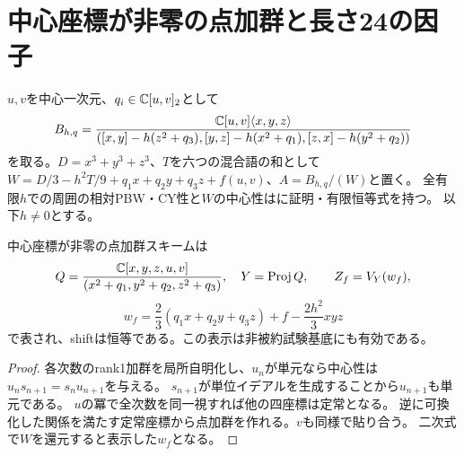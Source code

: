 \section{中心座標が非零の点加群と長さ24の因子}
$u,v$を中心一次元、$q_i\in\mathbb C[u,v]_2$として
\[
 B_{h,q}=\frac{\mathbb C[u,v]\langle x,y,z\rangle}
 {([x,y]-h(z^2+q_3),[y,z]-h(x^2+q_1),[z,x]-h(y^2+q_2))}
\]
を取る。$D=x^3+y^3+z^3$、$T$を六つの混合語の和として
$W=D/3-h^2T/9+q_1x+q_2y+q_3z+f(u,v)$、$A=B_{h,q}/(W)$と置く。
全有限$h$での周囲の相対PBW・CY性と$W$の中心性は\cite{Pair}に証明・有限恒等式を持つ。
以下$h\ne0$とする。

\begin{lemma}[定常点のスキーム表示]
中心座標が非零の点加群スキームは
\[
 Q=\frac{\mathbb C[x,y,z,u,v]}{(x^2+q_1,y^2+q_2,z^2+q_3)},\quad Y=\operatorname{Proj}Q,
 \qquad Z_f=V_Y(w_f),
\]
\[
 w_f=\frac23(q_1x+q_2y+q_3z)+f-\frac{2h^2}{3}xyz
\]
で表され、shiftは恒等である。この表示は非被約試験基底にも有効である。
\end{lemma}
\begin{proof}
各次数のrank1加群を局所自明化し、$u_n$が単元なら中心性は
$u_ns_{n+1}=s_nu_{n+1}$を与える。
$s_{n+1}$が単位イデアルを生成することから$u_{n+1}$も単元である。
$u$の冪で全次数を同一視すれば他の四座標は定常となる。
逆に可換化した関係を満たす定常座標から点加群を作れる。$v$も同様で貼り合う。
二次式で$W$を還元すると表示した$w_f$となる。
\end{proof}

